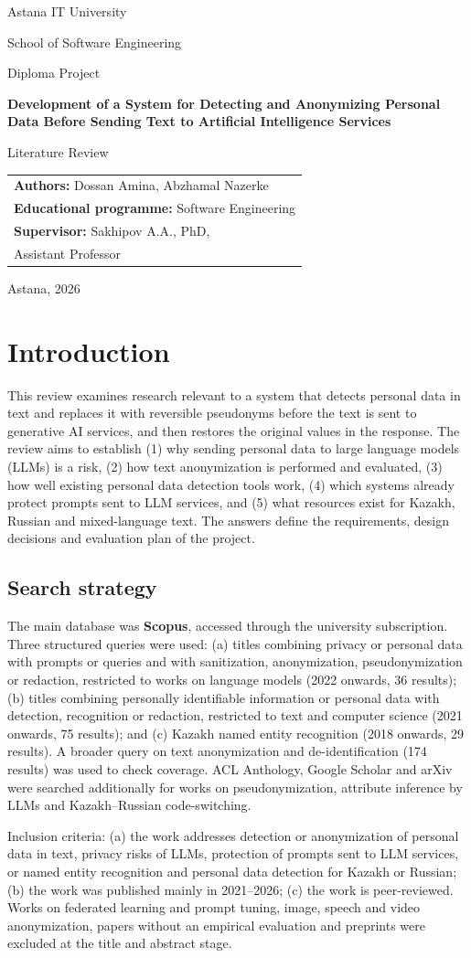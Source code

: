 \documentclass[12pt,a4paper]{article}
\makeatletter
\newcommand{\maketitlepage}[1]{%
\begin{titlepage}
\centering
{\large Astana IT University\par}
{\normalsize School of Software Engineering\par}
\vspace{4.5cm}
{\normalsize Diploma Project\par}
\vspace{0.6cm}
{\Large\bfseries Development of a System for Detecting and Anonymizing Personal Data Before Sending Text to Artificial Intelligence Services\par}
\vspace{1.2cm}
{\LARGE #1\par}
\vfill
\begin{flushright}
\begin{tabular}{@{}l@{}}
\textbf{Authors:} Dossan Amina, Abzhamal Nazerke\\
\textbf{Educational programme:} Software Engineering\\
\textbf{Supervisor:} Sakhipov A.A., PhD,\\ \hspace{2.2cm}Assistant Professor
\end{tabular}
\end{flushright}
\vspace{2.5cm}
{\normalsize Astana, 2026\par}
\end{titlepage}
\setcounter{page}{2}}
\makeatother
\begin{document}
\maketitlepage{Literature Review}

\tableofcontents
\newpage

\section{Introduction}

This review examines research relevant to a system that detects personal data in text and replaces it with reversible pseudonyms before the text is sent to generative AI services, and then restores the original values in the response. The review aims to establish (1) why sending personal data to large language models (LLMs) is a risk, (2) how text anonymization is performed and evaluated, (3) how well existing personal data detection tools work, (4) which systems already protect prompts sent to LLM services, and (5) what resources exist for Kazakh, Russian and mixed-language text. The answers define the requirements, design decisions and evaluation plan of the project.

\subsection{Search strategy}

The main database was \textbf{Scopus}, accessed through the university subscription. Three structured queries were used: (a) titles combining privacy or personal data with prompts or queries and with sanitization, anonymization, pseudonymization or redaction, restricted to works on language models (2022 onwards, 36 results); (b) titles combining personally identifiable information or personal data with detection, recognition or redaction, restricted to text and computer science (2021 onwards, 75 results); and (c) Kazakh named entity recognition (2018 onwards, 29 results). A broader query on text anonymization and de-identification (174 results) was used to check coverage. ACL Anthology, Google Scholar and arXiv were searched additionally for works on pseudonymization, attribute inference by LLMs and Kazakh--Russian code-switching.

Inclusion criteria: (a) the work addresses detection or anonymization of personal data in text, privacy risks of LLMs, protection of prompts sent to LLM services, or named entity recognition and personal data detection for Kazakh or Russian; (b) the work was published mainly in 2021--2026; (c) the work is peer-reviewed. Works on federated learning and prompt tuning, image, speech and video anonymization, papers without an empirical evaluation and preprints were excluded at the title and abstract stage.
\end{document}
